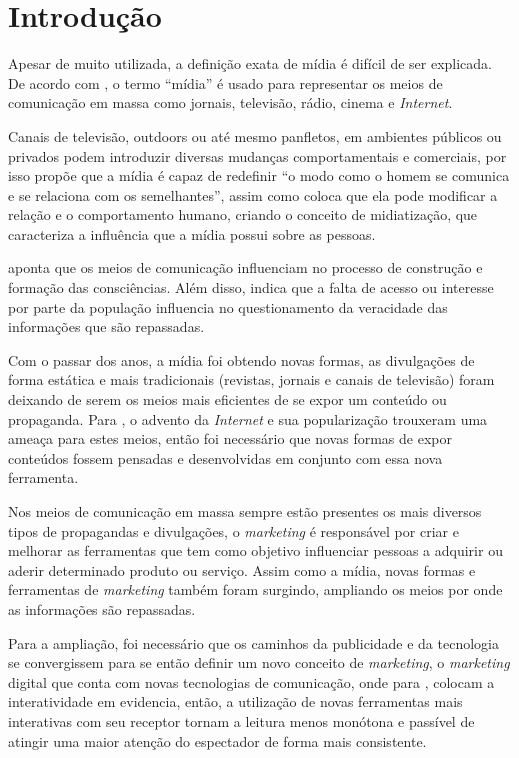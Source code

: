\chapter[Introdução]{Introdução}
Apesar de muito utilizada, a definição exata de mídia é difícil de ser explicada. De acordo com \citet[p.51]{guazina2007}, o termo ``mídia'' é usado para representar os meios de comunicação em massa como jornais, televisão, rádio, cinema e \textit{Internet}.

Canais de televisão, outdoors ou até mesmo panfletos, em ambientes públicos ou privados podem introduzir diversas mudanças comportamentais e comerciais, por isso \citet[p.3]{escobar2007} propõe que a mídia é capaz de redefinir ``o modo como o homem se comunica e se relaciona com os semelhantes'', assim como \citet[p.54]{hjarvard2012} coloca que ela pode modificar a relação e o comportamento humano, criando o conceito de midiatização, que caracteriza a influência que a mídia possui sobre as pessoas.

\citet[p.53]{guazina2007} aponta que os meios de comunicação influenciam no processo de construção e formação das consciências. Além disso, \citet{silva2007} indica que a falta de acesso ou interesse por parte da população influencia no questionamento da veracidade das informações que são repassadas.

Com o passar dos anos, a mídia foi obtendo novas formas, as divulgações de forma estática e mais tradicionais (revistas, jornais e canais de televisão) foram deixando de serem os meios mais eficientes de se expor um conteúdo ou propaganda. Para \citet{meditsch2001}, o advento da \textit{Internet} e sua popularização trouxeram uma ameaça para estes meios, então foi necessário que novas formas de expor conteúdos fossem pensadas e desenvolvidas em conjunto com essa nova ferramenta.

Nos meios de comunicação em massa sempre estão presentes os mais diversos tipos de propagandas e divulgações, o \textit{marketing} é responsável por criar e melhorar as ferramentas que tem como objetivo influenciar pessoas a adquirir ou aderir determinado produto ou serviço. Assim como a mídia, novas formas e ferramentas de \textit{marketing} também foram surgindo, ampliando os meios por onde as informações são repassadas. 

Para a ampliação, foi necessário que os caminhos da publicidade e da tecnologia se convergissem para se então definir um novo conceito de \textit{marketing}, o \textit{marketing} digital que conta com novas tecnologias de comunicação, onde para \citet[p.2]{escobar2007}, colocam a interatividade em evidencia, então, a utilização de novas ferramentas mais interativas com seu receptor tornam a leitura menos monótona e passível de atingir uma maior atenção do espectador de forma mais consistente.  

